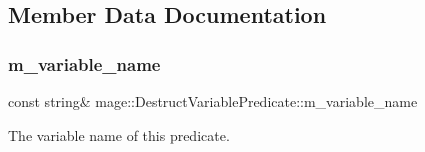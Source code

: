 \subsection{Member Data Documentation}
\hypertarget{structmage_1_1_destruct_variable_predicate_ab601ffdcc5c709dd8e4b35aa451148c2}{}\label{structmage_1_1_destruct_variable_predicate_ab601ffdcc5c709dd8e4b35aa451148c2} 
\subsubsection{\texorpdfstring{m\+\_\+variable\+\_\+name}{m\_variable\_name}}
{\footnotesize\ttfamily const string\& mage\+::\+Destruct\+Variable\+Predicate\+::m\+\_\+variable\+\_\+name}

The variable name of this predicate. 